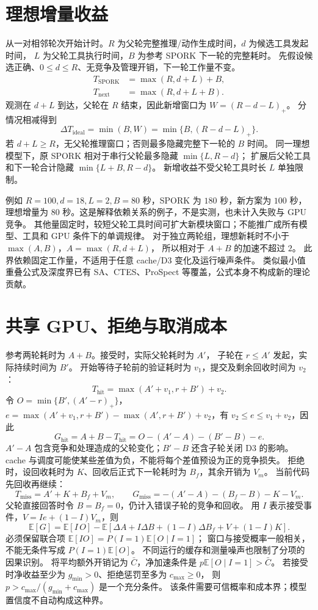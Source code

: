 \documentclass[UTF8,11pt]{ctexart}
\begin{document}
\section{理想增量收益}
从一对相邻轮次开始计时。$R$ 为父轮完整推理/动作生成时间，$d$ 为候选工具发起时间，
$L$ 为父轮工具执行时间，$B$ 为参考 SPORK 下一轮的完整耗时。
先假设候选正确、$0\le d\le R$、无竞争及管理开销，下一轮工作量不变。
\begin{align}
T_{\mathrm{SPORK}} &= \max(R,d+L)+B,\\
T_{\mathrm{next}} &= \max(R,d+L+B).
\end{align}
观测在 $d+L$ 到达，父轮在 $R$ 结束，因此新增窗口为 $W=(R-d-L)_+$。
分情况相减得到
\[
\boxed{\Delta T_{\mathrm{ideal}}=\min(B,W)=\min\{B,(R-d-L)_+\}.}
\]
若 $d+L\ge R$，无父轮推理窗口；否则最多隐藏完整下一轮的 $B$ 时间。
同一理想模型下，原 SPORK 相对于串行父轮最多隐藏 $\min\{L,R-d\}$；
扩展后父轮工具和下一轮合计隐藏 $\min\{L+B,R-d\}$。
新增收益不受父轮工具时长 $L$ 单独限制。

例如 $R=100,d=18,L=2,B=80$ 秒，SPORK 为 $180$ 秒，新方案为 $100$ 秒，
理想增量为 $80$ 秒。这是解释依赖关系的例子，不是实测，也未计入失败与 GPU 竞争。
其他量固定时，较短父轮工具时间可扩大新模块窗口；不能推广成所有模型、工具和 GPU 条件下的单调规律。
对于独立两轮组，理想新耗时不小于 $\max(A,B)$，$A=\max(R,d+L)$，
所以相对于 $A+B$ 的加速不超过 $2$。
此界依赖固定工作量，不适用于任意 cache/D3 变化及运行噪声条件。
类似最小值重叠公式及深度界已有 SA、CTES、ProSpect 等覆盖，公式本身不构成新的理论贡献。

\section{共享 GPU、拒绝与取消成本}
参考两轮耗时为 $A+B$。接受时，实际父轮耗时为 $A'$，
子轮在 $r\le A'$ 发起，实际持续时间为 $B'$。
开始等待子轮前的验证耗时为 $v_1$，提交及剩余回收时间为 $v_2$：
\[
T_{\mathrm{hit}}=\max(A'+v_1,r+B')+v_2.
\]
令 $O=\min\{B',(A'-r)_+\}$，
$e=\max(A'+v_1,r+B')-\max(A',r+B')+v_2$，有 $v_2\le e\le v_1+v_2$，因此
\[
G_{\mathrm{hit}}=A+B-T_{\mathrm{hit}}
=O-(A'-A)-(B'-B)-e.
\]
$A'-A$ 包含竞争和处理造成的父轮变化；$B'-B$ 还含子轮关闭 D3 的影响。
cache 与调度可能使某些差值为负，不能将每个差值预设为正的竞争损失。
拒绝时，设回收耗时为 $K$、回收后正式下一轮耗时为 $B_f$，其余开销为 $V_m$。
当前代码先回收再继续：
\[
T_{\mathrm{miss}}=A'+K+B_f+V_m,\qquad
G_{\mathrm{miss}}=-(A'-A)-(B_f-B)-K-V_m.
\]
父轮直接回答时令 $B=B_f=0$，仍计入错误子轮的竞争和回收。
用 $I$ 表示接受事件，$V=Ie+(1-I)V_m$，则
\[
\boxed{\mathbb E[G]=\mathbb E[I\,O]-
\mathbb E[\Delta A+I\Delta B+(1-I)\Delta B_f+V+(1-I)K].}
\]
必须保留联合项 $\mathbb E[IO]=P(I=1)\mathbb E[O\mid I=1]$；
窗口与接受概率一般相关，不能无条件写成 $P(I=1)\mathbb E[O]$。
不同运行的缓存和测量噪声也限制了分项的因果识别。
将平均额外开销记为 $\bar C$，净加速条件是 $p\mathbb E[O\mid I=1]>\bar C$。
若接受时净收益至少为 $g_{\min}>0$、拒绝惩罚至多为 $c_{\max}\ge0$，
则 $p>c_{\max}/(g_{\min}+c_{\max})$ 是一个充分条件。
该条件需要可信概率和成本界；模型置信度不自动构成这种界。
\end{document}
